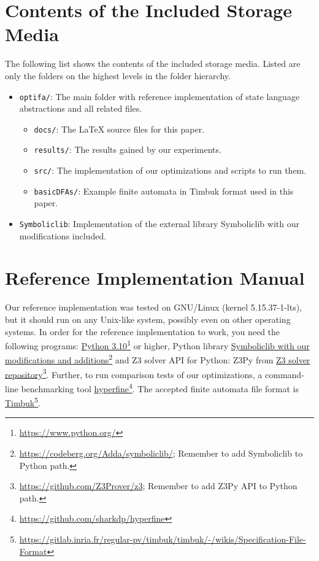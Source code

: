
\chapter{Contents of the Included Storage Media}

The following list shows the contents of the included storage media. Listed are only the folders on the highest levels in the folder hierarchy.

\begin{itemize}
    \item \texttt{optifa/}: The main folder with reference implementation of state language abstractions and all related files.
    \begin{itemize}
        \item \texttt{docs/}: The LaTeX source files for this paper.
        \item \texttt{results/}: The results gained by our experiments.
        \item \texttt{src/}: The implementation of our optimizations and scripts to run them.
        \item \texttt{basicDFAs/}: Example finite automata in Timbuk format used in this paper.
    \end{itemize}

    \item \texttt{Symboliclib}: Implementation of the external library Symboliclib with our modifications included.

\end{itemize}


\chapter{Reference Implementation Manual}

Our reference implementation was tested on GNU/Linux (kernel 5.15.37-1-lts), but it should run on any Unix-like system, possibly even on other operating systems.
In order for the reference implementation to work, you need the following programs: \href{https://www.python.org/}{Python 3.10}\footnote{\url{https://www.python.org/}} or higher, Python library \href{https://codeberg.org/Adda/symboliclib/}{Symboliclib with our modifications and additions}\footnote{\url{https://codeberg.org/Adda/symboliclib/}; Remember to add Symboliclib to Python path.} and Z3 solver API for Python: Z3Py from \href{https://github.com/Z3Prover/z3}{Z3 solver repository}\footnote{\url{https://github.com/Z3Prover/z3}; Remember to add Z3Py API to Python path.}. Further, to run comparison tests of our optimizations, a command-line benchmarking tool \href{https://github.com/sharkdp/hyperfine}{hyperfine}\footnote{\url{https://github.com/sharkdp/hyperfine}}. The accepted finite automata file format is \href{https://gitlab.inria.fr/regular-pv/timbuk/timbuk/-/wikis/Specification-File-Format}{Timbuk}\footnote{\url{https://gitlab.inria.fr/regular-pv/timbuk/timbuk/-/wikis/Specification-File-Format}}.

